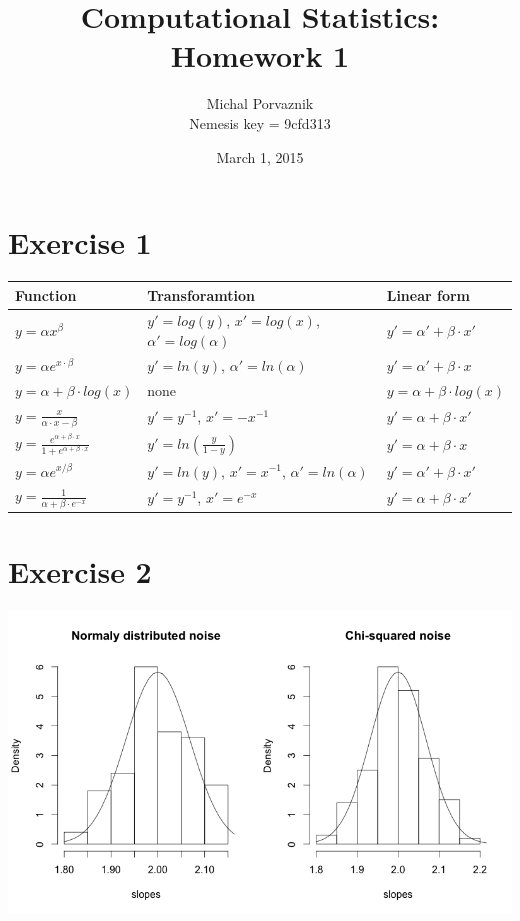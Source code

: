 \documentclass[a4paper,12pt]{article}
\begin{document}
\title{\textbf{Computational Statistics: Homework 1}}
\author{Michal Porvaznik \\ Nemesis key = 9cfd313}
\date{March 1, 2015}
\maketitle
%
\section*{Exercise 1}
%
\begin{center}
    \begin{tabular}{| l | l | p{5 cm} |}
    \hline
    Function & Transforamtion & Linear form \\ \hline
    $y = \alpha x^{\beta}$ & $y' = log(y)$, $x' = log(x)$, ${\alpha}' = log(\alpha)$ & $y' = {\alpha}' + \beta \cdot x'$ \\ \hline
    $y = \alpha e^{x \cdot {\beta}}$ & $y' = ln(y)$, ${\alpha}' = ln(\alpha)$ & $y' =\alpha' + \beta \cdot x$ \\ \hline
    $y = \alpha + \beta \cdot log(x)$ & none & $y = \alpha + \beta \cdot log(x)$ \\ \hline
    $y = \frac{x}{\alpha \cdot x - \beta}$ & $y' = y^{-1}$, $x' = -x^{-1}$ & $y' =\alpha + \beta \cdot x'$ \\ \hline
        $y = \frac{e^{\alpha + \beta \cdot x}}{1 + e^{\alpha + \beta \cdot x}}$ & $y' = ln(\frac{y}{1-y})$ & $y' = \alpha + \beta \cdot x$ \\ \hline
        $y = \alpha e^{x / {\beta}}$ & $y' = ln(y)$, $x' = x^{-1}$, $\alpha' = ln(\alpha)$ & $y' = \alpha' + \beta \cdot x'$ \\ \hline
        $y = \frac{1}{\alpha + \beta \cdot e^{-x}}$ & $y' = y^{-1}$, $x' = e^{-x}$ & $y' = \alpha + \beta \cdot x'$ \\ \hline
    
    \end{tabular}
\end{center}

\section*{Exercise 2}
%
\includegraphics[scale = 0.55]{ex1_plot.png}
\end{document}
